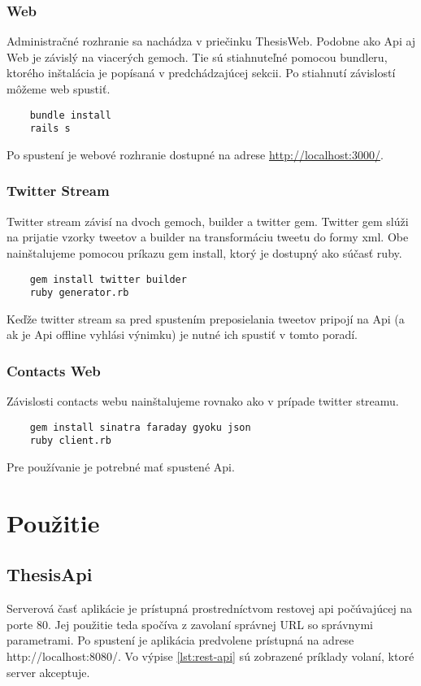 \subsubsection{Web}
	Administračné rozhranie sa nachádza v priečinku ThesisWeb. Podobne ako Api aj Web je závislý na viacerých gemoch. Tie sú stiahnuteľné pomocou bundleru, ktorého inštalácia je popísaná v predchádzajúcej sekcii. Po stiahnutí závislostí môžeme web spustiť.
	\begin{lstlisting}
	bundle install
	rails s
	\end{lstlisting}
	Po spustení je webové rozhranie dostupné na adrese \url{http://localhost:3000/}.
		
\subsubsection{Twitter Stream}
	Twitter stream závisí na dvoch gemoch, builder a twitter gem. Twitter gem slúži na prijatie vzorky tweetov a builder na transformáciu tweetu do formy xml. Obe nainštalujeme pomocou príkazu gem install, ktorý je dostupný ako súčasť ruby.
	\begin{lstlisting}
	gem install twitter builder
	ruby generator.rb
	\end{lstlisting}
	Keďže twitter stream sa pred spustením preposielania tweetov pripojí na Api (a ak je Api offline vyhlási výnimku) je nutné ich spustiť v tomto poradí.
	
\subsubsection{Contacts Web}
	Závislosti contacts webu nainštalujeme rovnako ako v prípade twitter streamu.		
	\begin{lstlisting}
	gem install sinatra faraday gyoku json
	ruby client.rb
	\end{lstlisting}
	Pre používanie je potrebné mať spustené Api.

\section{Použitie}

	\subsection{ThesisApi}
	Serverová časť aplikácie je prístupná prostredníctvom restovej api počúvajúcej na porte 80. Jej použitie teda spočíva z zavolaní správnej URL so správnymi parametrami. Po spustení je aplikácia predvolene prístupná na adrese http://localhost:8080/. Vo výpise \ref{lst:rest-api} sú zobrazené príklady volaní, ktoré server akceptuje.

